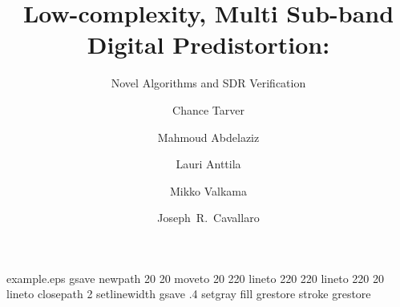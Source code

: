 %
%
%
%
%
\begin{filecontents*}{example.eps}
gsave
newpath
  20 20 moveto
  20 220 lineto
  220 220 lineto
  220 20 lineto
closepath
2 setlinewidth
gsave
  .4 setgray fill
grestore
stroke
grestore
\end{filecontents*}
%
\RequirePackage{fix-cm}
%
\documentclass[twocolumn]{svjour3}          %
%
\smartqed  %
%
\usepackage{amsmath,graphicx}
\usepackage{import}
\usepackage[ruled]{algorithm2e}
\usepackage{color}
%
%
%
%
%


\title{Low-complexity, Multi Sub-band Digital Predistortion:%
}
\subtitle{Novel Algorithms and SDR Verification}


\author{Chance Tarver         \and
        Mahmoud Abdelaziz \and
        Lauri Anttila \and
        Mikko Valkama \and
        Joseph~R.~Cavallaro
}


